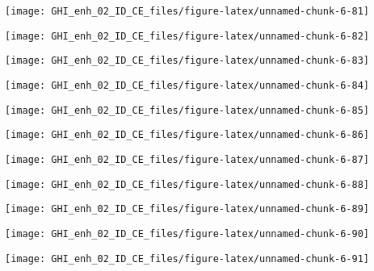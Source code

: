 \documentclass[
  10pt,
  a4paper,oneside]{article}
\begin{document}
\begin{center}\texttt{[image: GHI\_enh\_02\_ID\_CE\_files/figure-latex/unnamed-chunk-6-81]} \end{center}

\begin{center}\texttt{[image: GHI\_enh\_02\_ID\_CE\_files/figure-latex/unnamed-chunk-6-82]} \end{center}

\begin{center}\texttt{[image: GHI\_enh\_02\_ID\_CE\_files/figure-latex/unnamed-chunk-6-83]} \end{center}

\begin{center}\texttt{[image: GHI\_enh\_02\_ID\_CE\_files/figure-latex/unnamed-chunk-6-84]} \end{center}

\begin{center}\texttt{[image: GHI\_enh\_02\_ID\_CE\_files/figure-latex/unnamed-chunk-6-85]} \end{center}

\begin{center}\texttt{[image: GHI\_enh\_02\_ID\_CE\_files/figure-latex/unnamed-chunk-6-86]} \end{center}

\begin{center}\texttt{[image: GHI\_enh\_02\_ID\_CE\_files/figure-latex/unnamed-chunk-6-87]} \end{center}

\begin{center}\texttt{[image: GHI\_enh\_02\_ID\_CE\_files/figure-latex/unnamed-chunk-6-88]} \end{center}

\begin{center}\texttt{[image: GHI\_enh\_02\_ID\_CE\_files/figure-latex/unnamed-chunk-6-89]} \end{center}

\begin{center}\texttt{[image: GHI\_enh\_02\_ID\_CE\_files/figure-latex/unnamed-chunk-6-90]} \end{center}

\begin{center}\texttt{[image: GHI\_enh\_02\_ID\_CE\_files/figure-latex/unnamed-chunk-6-91]} \end{center}
\end{document}
